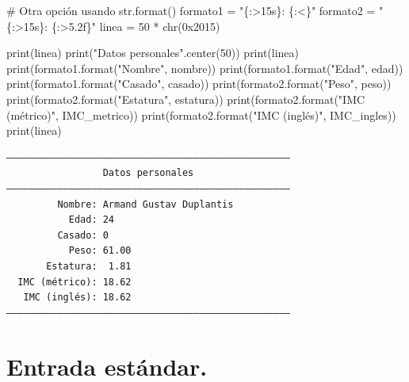 \documentclass[
  spanish,
  letterpaper,
]{scrbook}
\newenvironment{Shaded}{\begin{snugshade}}{\end{snugshade}}
\newcommand{\BaseNTok}[1]{\textcolor[rgb]{0.68,0.00,0.00}{#1}}
\newcommand{\BuiltInTok}[1]{\textcolor[rgb]{0.00,0.23,0.31}{#1}}
\newcommand{\CommentTok}[1]{\textcolor[rgb]{0.37,0.37,0.37}{#1}}
\newcommand{\DecValTok}[1]{\textcolor[rgb]{0.68,0.00,0.00}{#1}}
\newcommand{\NormalTok}[1]{\textcolor[rgb]{0.00,0.23,0.31}{#1}}
\newcommand{\OperatorTok}[1]{\textcolor[rgb]{0.37,0.37,0.37}{#1}}
\newcommand{\SpecialCharTok}[1]{\textcolor[rgb]{0.37,0.37,0.37}{#1}}
\newcommand{\StringTok}[1]{\textcolor[rgb]{0.13,0.47,0.30}{#1}}
\theoremstyle{definition}
\theoremstyle{remark}
\begin{document}
\begin{Shaded}
\begin{Highlighting}[]
\CommentTok{\# Otra opción usando str.format()}
\NormalTok{formato1 }\OperatorTok{=} \StringTok{"}\SpecialCharTok{\{:\textgreater{}15s\}}\StringTok{: }\SpecialCharTok{\{:\textless{}\}}\StringTok{"}
\NormalTok{formato2 }\OperatorTok{=} \StringTok{"}\SpecialCharTok{\{:\textgreater{}15s\}}\StringTok{: }\SpecialCharTok{\{:\textgreater{}5.2f\}}\StringTok{"}
\NormalTok{linea }\OperatorTok{=} \DecValTok{50} \OperatorTok{*} \BuiltInTok{chr}\NormalTok{(}\BaseNTok{0x2015}\NormalTok{)}

\BuiltInTok{print}\NormalTok{(linea)}
\BuiltInTok{print}\NormalTok{(}\StringTok{"Datos personales"}\NormalTok{.center(}\DecValTok{50}\NormalTok{))}
\BuiltInTok{print}\NormalTok{(linea)}
\BuiltInTok{print}\NormalTok{(formato1.}\BuiltInTok{format}\NormalTok{(}\StringTok{"Nombre"}\NormalTok{, nombre))}
\BuiltInTok{print}\NormalTok{(formato1.}\BuiltInTok{format}\NormalTok{(}\StringTok{"Edad"}\NormalTok{, edad))}
\BuiltInTok{print}\NormalTok{(formato1.}\BuiltInTok{format}\NormalTok{(}\StringTok{"Casado"}\NormalTok{, casado))}
\BuiltInTok{print}\NormalTok{(formato2.}\BuiltInTok{format}\NormalTok{(}\StringTok{"Peso"}\NormalTok{, peso))}
\BuiltInTok{print}\NormalTok{(formato2.}\BuiltInTok{format}\NormalTok{(}\StringTok{"Estatura"}\NormalTok{, estatura))}
\BuiltInTok{print}\NormalTok{(formato2.}\BuiltInTok{format}\NormalTok{(}\StringTok{"IMC (métrico)"}\NormalTok{, IMC\_metrico))}
\BuiltInTok{print}\NormalTok{(formato2.}\BuiltInTok{format}\NormalTok{(}\StringTok{"IMC (inglés)"}\NormalTok{, IMC\_ingles))}
\BuiltInTok{print}\NormalTok{(linea)}
\end{Highlighting}
\end{Shaded}

\begin{verbatim}
――――――――――――――――――――――――――――――――――――――――――――――――――
                 Datos personales                 
――――――――――――――――――――――――――――――――――――――――――――――――――
         Nombre: Armand Gustav Duplantis
           Edad: 24
         Casado: 0
           Peso: 61.00
       Estatura:  1.81
  IMC (métrico): 18.62
   IMC (inglés): 18.62
――――――――――――――――――――――――――――――――――――――――――――――――――
\end{verbatim}

\section{Entrada estándar.}\label{entrada-estuxe1ndar.}
\end{document}
